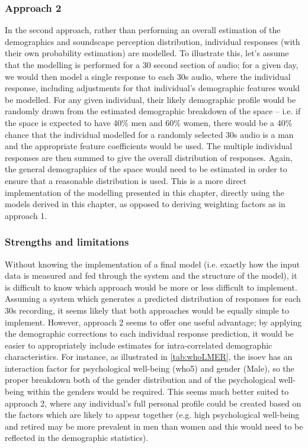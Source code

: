 \subsubsection{Approach 2}
In the second approach, rather than performing an overall estimation of the demographics and soundscape perception distribution, individual responses (with their own probability estimation) are modelled. To illustrate this, let's assume that the modelling is performed for a 30 second section of audio; for a given day, we would then model a single response to each 30s audio, where the individual response, including adjustments for that individual's demographic features would be modelled. For any given individual, their likely demographic profile would be randomly drawn from the estimated demographic breakdown of the space -- i.e. if the space is expected to have 40\% men and 60\% women, there would be a 40\% chance that the individual modelled for a randomly selected 30s audio is a man and the appropriate feature coefficients would be used. The multiple individual responses are then summed to give the overall distribution of responses. Again, the general demographics of the space would need to be estimated in order to ensure that a reasonable distribution is used. This is a more direct implementation of the modelling presented in this chapter, directly using the models derived in this chapter, as opposed to deriving weighting factors as in approach 1.

\subsubsection{Strengths and limitations}
Without knowing the implementation of a final model (i.e. exactly how the input data is measured and fed through the system and the structure of the model), it is difficult to know which approach would be more or less difficult to implement. Assuming a system which generates a predicted distribution of responses for each 30s recording, it seems likely that both approaches would be equally simple to implement. However, approach 2 seems to offer one useful advantage; by applying the demographic corrections to each individual response prediction, it would be easier to appropriately include estimates for intra-correlated demographic characteristics. For instance, as illustrated in \cref{tab:whoLMER}, the \gls{isoev} has an interaction factor for psychological well-being (\gls{who5}) and gender (Male), so the proper breakdown both of the gender distribution and of the psychological well-being within the genders would be required. This seems much better suited to approach 2, where any individual's full personal profile could be created based on the factors which are likely to appear together (e.g. high psychological well-being and retired may be more prevalent in men than women and this would need to be reflected in the demographic statistics). 

